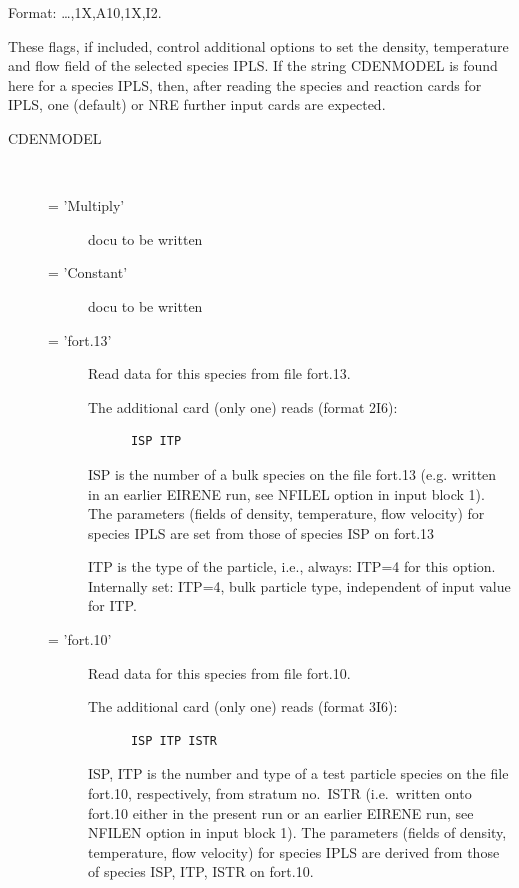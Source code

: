 Format: \dots,1X,A10,1X,I2.

These flags, if included, control additional options to set the density,
temperature and flow field of the selected species IPLS.
If the string CDENMODEL is found here for a species IPLS, then, after reading
the species and reaction cards for IPLS, one (default) or NRE further input
cards are expected.
\begin{description}
  \item[CDENMODEL] ~ 

        \begin{description}
          \item[= 'Multiply'] docu to be written
          \item[= 'Constant']
                docu to be written
          \item[= 'fort.13'] Read data for this species from file
                fort.13.

                The additional card (only one) reads (format 2I6):

                \begin{lstlisting}
      ISP ITP
\end{lstlisting}

                ISP is the number of a bulk species on the file fort.13 (e.g. written in an
                earlier EIRENE run, see NFILEL option in input block 1).
                The parameters (fields of density, temperature, flow velocity) for species IPLS
                are set from those of species ISP on fort.13 

                ITP is the type of the particle, i.e., always: ITP=4 for this option.
                Internally set: ITP=4, bulk particle type, independent of input value for ITP.

          \item[= 'fort.10'] Read data for this species from file fort.10.

                The additional card (only one) reads (format 3I6):

                \begin{lstlisting}
      ISP ITP ISTR
\end{lstlisting}

                ISP, ITP is the number and type of a test particle species on the file fort.10,
                respectively, from stratum no.\ ISTR (i.e.\ written onto fort.10 either in the
                present run or an earlier EIRENE run, see NFILEN option in input block 1).
                The parameters (fields of density, temperature, flow velocity) for species IPLS
                are derived from those of species ISP, ITP, ISTR on fort.10.


\end{description}
\end{description}
